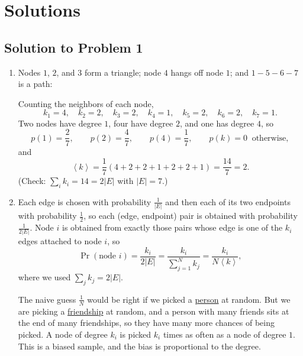 \documentclass[a4paper,12pt]{article}
\begin{document}
\newpage

\section*{Solutions}

\subsection*{Solution to Problem 1}

\begin{enumerate}[label=(\alph*)]
\item Nodes $1$, $2$, and $3$ form a triangle; node $4$ hangs off node $1$; and $1-5-6-7$ is a path:
\begin{center}
\end{center}
Counting the neighbors of each node,
\[ k_1=4, \quad k_2=2, \quad k_3=2, \quad k_4=1, \quad k_5=2, \quad k_6=2, \quad k_7=1 . \]
Two nodes have degree $1$, four have degree $2$, and one has degree $4$, so
\[ p(1)=\frac{2}{7}, \qquad p(2)=\frac{4}{7}, \qquad p(4)=\frac{1}{7}, \qquad p(k)=0 \ \text{ otherwise} , \]
and
\[ \left\langle k \right\rangle = \frac{1}{7}\left( 4+2+2+1+2+2+1 \right) = \frac{14}{7} = 2 . \]
(Check: $\sum_i k_i = 14 = 2\left| E \right|$ with $\left| E \right|=7$.)

\item Each edge is chosen with probability $\frac{1}{\left| E \right|}$ and then each of its two endpoints with probability $\frac{1}{2}$, so each (edge, endpoint) pair is obtained with probability $\frac{1}{2\left| E \right|}$. Node $i$ is obtained from exactly those pairs whose edge is one of the $k_i$ edges attached to node $i$, so
\[ \Pr(\text{node } i) = \frac{k_i}{2\left| E \right|} = \frac{k_i}{\sum_{j=1}^{N}k_j} = \frac{k_i}{N\left\langle k \right\rangle} , \]
where we used $\sum_j k_j = 2\left| E \right|$.

The naive guess $\frac{1}{N}$ would be right if we picked a \underline{person} at random. But we are picking a \underline{friendship} at random, and a person with many friends sits at the end of many friendships, so they have many more chances of being picked. A node of degree $k_i$ is picked $k_i$ times as often as a node of degree $1$. This is a biased sample, and the bias is proportional to the degree.


\end{enumerate}
\end{document}
